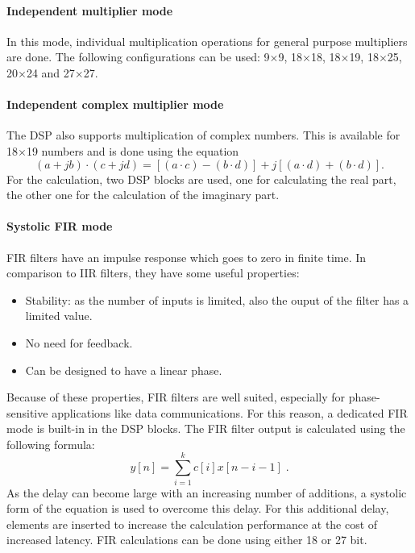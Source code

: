 \paragraph{Independent multiplier mode}
In this mode, individual multiplication operations for general purpose multipliers are done. The following configurations can be used: 9$\times$9, 18$\times$18, 18$\times$19, 18$\times$25, 20$\times$24 and 27$\times$27.
\paragraph{Independent complex multiplier mode}
The DSP also supports multiplication of complex numbers. This is available for 18$\times$19 numbers and is done using the equation
\begin{equation}
(a+jb)\cdot (c+jd)=[(a\cdot c)-(b\cdot d)]+j[(a\cdot d)+(b\cdot d)].
\end{equation}
For the calculation, two DSP blocks are used, one for calculating the real part, the other one for the calculation of the imaginary part.
\paragraph{Systolic FIR mode}
FIR filters have an impulse response which goes to zero in finite time. In comparison to IIR filters, they have some useful properties:
\begin{itemize}
\item Stability: as the number of inputs is limited, also the ouput of the filter has a limited value.
\item No need for feedback.
\item Can be designed to have a linear phase.
\end{itemize}
Because of these properties, FIR filters are well suited, especially for phase-sensitive applications like data communications. For this reason, a dedicated FIR mode is built-in in the DSP blocks. The FIR filter output is calculated using the following formula:
\begin{equation}
y[n]=\sum_{i=1}^{k}c[i]x[n-i-1]\;.
\end{equation}
As the delay can become large with an increasing number of additions, a systolic form of the equation is used to overcome this delay. For this additional delay, elements are inserted to increase the calculation performance at the cost of increased latency. FIR calculations can be done using either 18 or 27 bit.
